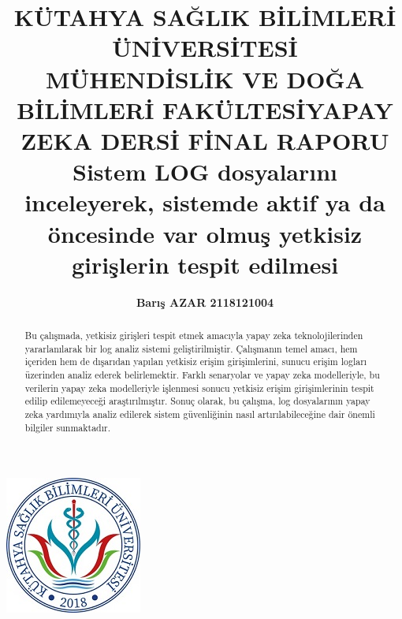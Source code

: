 \documentclass[12pt,a4paper]{article}
\title{\bf\fontsize{12pt}{14pt}\selectfont KÜTAHYA SAĞLIK BİLİMLERİ ÜNİVERSİTESİ \\ MÜHENDİSLİK VE DOĞA BİLİMLERİ FAKÜLTESİ}
\date{}
\begin{document}
	
	\maketitle
	\begin{center}
			\includegraphics[width=0.25\linewidth]{ksbu.png}
	\end{center}
	\begin{center}
	\end{center}
	\begin{center}
	\title{\bf\fontsize{12pt}{14pt}\selectfont YAPAY ZEKA DERSİ FİNAL RAPORU }
	\end{center}
		\begin{center}
		\title{\bf\fontsize{12pt}{14pt}\selectfont Sistem LOG dosyalarını inceleyerek, sistemde aktif ya da öncesinde
var olmuş yetkisiz girişlerin tespit edilmesi}
        \end{center}
	\begin{center}
	\end{center}
	\begin{center}
		
	
	\author{\bf\fontsize{12pt}{14pt}Barış AZAR \hspace{1.5cm}2118121004}
	
	\begin{center}
	\end{center}
  \bf\fontsize{12pt}{14pt}\selectfont {Anahtar kelimeler: LOG Analizi, LSTM, Yapay Zeka, Access.log\newline}
    \begin{abstract}
Bu çalışmada, yetkisiz girişleri tespit etmek amacıyla yapay zeka teknolojilerinden yararlanılarak bir log analiz sistemi geliştirilmiştir.
Çalışmanın temel amacı, hem içeriden hem de dışarıdan yapılan yetkisiz erişim girişimlerini, sunucu erişim logları üzerinden analiz ederek belirlemektir.
Farklı senaryolar ve yapay zeka modelleriyle, bu verilerin yapay zeka modelleriyle işlenmesi sonucu yetkisiz erişim girişimlerinin tespit edilip edilemeyeceği araştırılmıştır.
Sonuç olarak, bu çalışma, log dosyalarının yapay zeka yardımıyla analiz edilerek sistem güvenliğinin nasıl artırılabileceğine dair önemli bilgiler sunmaktadır.    \end{abstract}

	\end{center}
\end{document}
